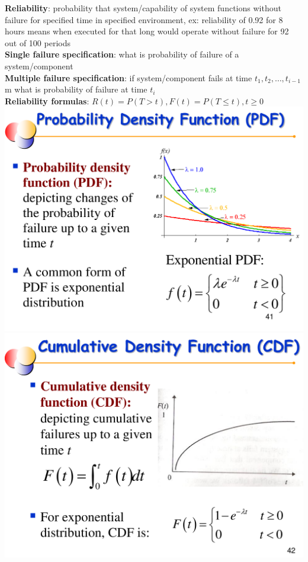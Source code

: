 \documentclass[a4paper]{article}
\begin{document}
\begin{multicols}{3}
        \textbf{Reliability}: probability that system/capability of system functions without failure for specified time in specified environment, ex: reliability of 0.92 for 8 hours means when executed for that long would operate without failure for 92 out of 100 periods\\
        \textbf{Single failure specification}: what is probability of failure of a system/component\\
        \textbf{Multiple failure specification}: if system/component fails at time $t_1,t_2, \ldots, t_{i-1}$m what is probability of failure at time $t_i$\\
        \textbf{Reliability formulas}: $R(t) = P(T > t), F(t) = P(T \leq t), t \geq 0$\\
        \includegraphics[width=\linewidth]{385.pdf}\\
        \includegraphics[width=\linewidth]{386.pdf}\\

\end{multicols}
\end{document}
